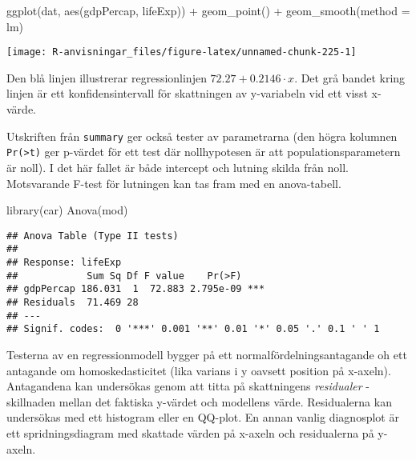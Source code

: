 \documentclass[
]{book}
\newenvironment{Shaded}{\begin{snugshade}}{\end{snugshade}}
\newcommand{\AttributeTok}[1]{\textcolor[rgb]{0.77,0.63,0.00}{#1}}
\newcommand{\FunctionTok}[1]{\textcolor[rgb]{0.00,0.00,0.00}{#1}}
\newcommand{\NormalTok}[1]{#1}
\newcommand{\SpecialCharTok}[1]{\textcolor[rgb]{0.00,0.00,0.00}{#1}}
\theoremstyle{definition}
\theoremstyle{definition}
\theoremstyle{definition}
\theoremstyle{definition}
\theoremstyle{remark}
\begin{document}
\begin{Shaded}
\begin{Highlighting}[]
\FunctionTok{ggplot}\NormalTok{(dat, }\FunctionTok{aes}\NormalTok{(gdpPercap, lifeExp)) }\SpecialCharTok{+}
  \FunctionTok{geom\_point}\NormalTok{() }\SpecialCharTok{+}
  \FunctionTok{geom\_smooth}\NormalTok{(}\AttributeTok{method =}\NormalTok{ lm)}
\end{Highlighting}
\end{Shaded}

\begin{center}\texttt{[image: R-anvisningar\_files/figure-latex/unnamed-chunk-225-1]} \end{center}

Den blå linjen illustrerar regressionlinjen \(72.27 + 0.2146 \cdot x\). Det grå bandet kring linjen är ett konfidensintervall för skattningen av y-variabeln vid ett visst x-värde.

Utskriften från \texttt{summary} ger också tester av parametrarna (den högra kolumnen \texttt{Pr(\textgreater{}\textbar{}t\textbar{})} ger p-värdet för ett test där nollhypotesen är att populationsparametern är noll). I det här fallet är både intercept och lutning skilda från noll. Motsvarande F-test för lutningen kan tas fram med en anova-tabell.

\begin{Shaded}
\begin{Highlighting}[]
\FunctionTok{library}\NormalTok{(car)}
\FunctionTok{Anova}\NormalTok{(mod)}
\end{Highlighting}
\end{Shaded}

\begin{verbatim}
## Anova Table (Type II tests)
## 
## Response: lifeExp
##            Sum Sq Df F value    Pr(>F)    
## gdpPercap 186.031  1  72.883 2.795e-09 ***
## Residuals  71.469 28                      
## ---
## Signif. codes:  0 '***' 0.001 '**' 0.01 '*' 0.05 '.' 0.1 ' ' 1
\end{verbatim}

Testerna av en regressionmodell bygger på ett normalfördelningsantagande oh ett antagande om homoskedasticitet (lika varians i y oavsett position på x-axeln). Antagandena kan undersökas genom att titta på skattningens \emph{residualer} - skillnaden mellan det faktiska y-värdet och modellens värde. Residualerna kan undersökas med ett histogram eller en QQ-plot. En annan vanlig diagnosplot är ett spridningsdiagram med skattade värden på x-axeln och residualerna på y-axeln.
\end{document}
